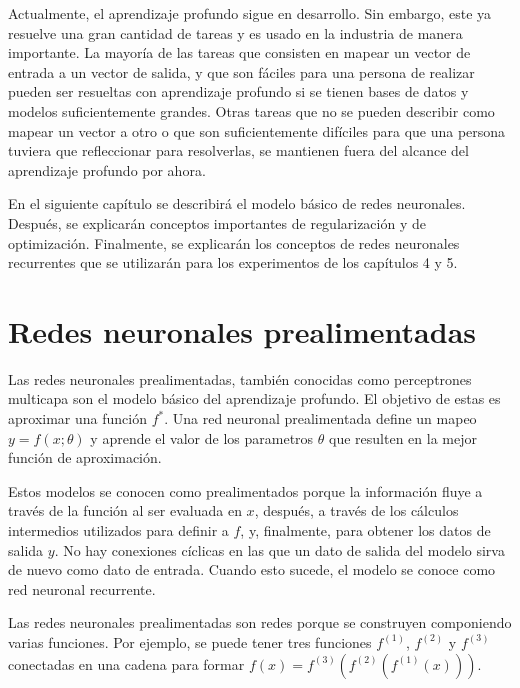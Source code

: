 \vspace{1em}

Actualmente, el aprendizaje profundo sigue en desarrollo. Sin embargo, este ya resuelve una gran cantidad de tareas y es usado en la industria de manera importante. La mayoría de las tareas que consisten en mapear un vector de entrada a un vector de salida, y que son fáciles para una persona de realizar pueden ser resueltas con aprendizaje profundo si se tienen bases de datos y modelos suficientemente grandes. Otras tareas que no se pueden describir como mapear un vector a otro o que son suficientemente difíciles para que una persona tuviera que refleccionar para resolverlas, se mantienen fuera del alcance del aprendizaje profundo por ahora.
\cite{goodfellow-et-al-2016}

\vspace{1em}

En el siguiente capítulo se describirá el modelo básico de redes neuronales. Después, se explicarán conceptos importantes de regularización y de optimización. Finalmente, se explicarán los conceptos de redes neuronales recurrentes que se utilizarán para los experimentos de los capítulos 4 y 5.

\section{Redes neuronales prealimentadas}
Las redes neuronales prealimentadas, también conocidas como perceptrones multicapa son el modelo básico del aprendizaje profundo. El objetivo de estas es aproximar una función $f^*$. Una red neuronal prealimentada define un mapeo $y = f(x;\theta)$ y aprende el valor de los parametros $\theta$ que resulten en la mejor función de aproximación. 

\vspace{1em}

Estos modelos se conocen como prealimentados porque la información fluye a través de la función al ser evaluada en $x$, después, a través de los cálculos intermedios utilizados para definir a $f$, y, finalmente, para obtener los datos de salida $y$. No hay conexiones cíclicas en las que un dato de salida del modelo sirva de nuevo como dato de entrada. Cuando esto sucede, el modelo se conoce como red neuronal recurrente.
\cite{goodfellow-et-al-2016}

\vspace{1em}

Las redes neuronales prealimentadas son redes porque se construyen componiendo varias funciones. Por ejemplo, se puede tener tres funciones $f^{(1)}$, $f^{(2)}$ y $f^{(3)}$ conectadas en una cadena para formar $f(x) = f^{(3)}(f^{(2)}(f^{(1)}(x)))$.

